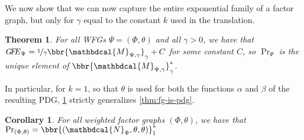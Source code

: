 \documentclass[letterpaper]{article} %
\theoremstyle{plain}
\newtheorem{theorem}{Theorem}[section]
\newtheorem{coro}{Corollary}[theorem]
\theoremstyle{definition}
\theoremstyle{remark}
\newcommand{\begthm}[3][]{\begin{#2}[{name=#1},restate=#3,label=#3]}
\newcommand{\dg}[1]{\mathbdcal{#1}}
\newcommand{\UPDGof}[1]{{\dg N}_{#1}}
\newcommand\GFE{\mathit{G\mkern-4mu F\mkern-4.5mu E}}
\begin{document}



We now show that we can now capture the entire exponential family of a factor graph,
but only for $\gamma$ equal to the constant $k$ used in
the translation.  


\begin{theorem}\label{thm:wfg-is-pdg}
For all WFGs $\Psi = (\Phi,\theta)$ and all $\gamma > 0$,
we have that
$\GFE_\Psi
= \nicefrac1{\gamma} \bbr{{\dg M}_{\Psi,\gamma}}_{\gamma} 
+ C$   
for some constant $C$, so
$\Pr_{\Psi}$ is the unique element of
$\bbr{{\dg M}_{\Psi,\gamma}}_{\gamma}^*$.
\end{theorem}

In particular, for $k\!=\!1$, so that $\theta$ is used for both the functions
$\alpha$ and $\beta$ of the resulting PDG,
\cref{thm:wfg-is-pdg} strictly generalizes \cref{thm:fg-is-pdg}.
\begin{coro}
	For all weighted factor graphs $(\Phi, \theta)$,
	we have that
	$\Pr_{(\Phi,\theta)} = \bbr{(\UPDGof{\Phi}, \theta,\theta)}_1^*$
\end{coro}
\end{document}
